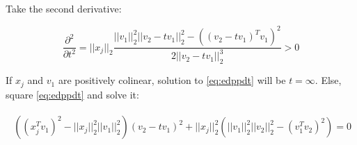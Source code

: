 Take the second derivative:

\begin{equation}
    \frac{\partial^2}{\partial t^2}=||x_j||_2\frac{||v_1||^2_2||v_2-tv_1||^2_2-\left((v_2-tv_1)^Tv_1\right)^2}{2||v_2-tv_1||^3_2}>0
\end{equation}

If $x_j$ and $v_1$ are positively colinear, solution to \eqref{eq:edppdt} will be $t=\infty$. Else, square \eqref{eq:edppdt} and solve it:

\begin{gather}
    \begin{aligned}
        \left((x_j^Tv_1)^2-||x_j||_2^2||v_1||_2^2\right)(v_2-tv_1)^2+||x_j||_2^2\left(||v_1||_2^2||v_2||_2^2-(v_1^Tv_2)^2\right)=0
    \end{aligned}
\end{gather}



